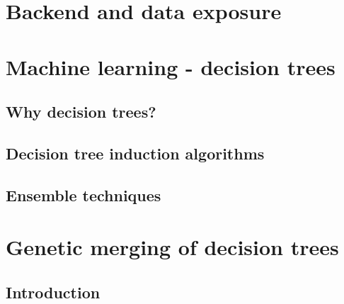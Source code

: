 \documentclass[english]{beamer}
\begin{document}
\section{Backend and data exposure}
\section{Machine learning - decision trees}

\subsection*{Why decision trees?}

\subsection*{Decision tree induction algorithms}

\subsection*{Ensemble techniques}

\section{Genetic merging of decision trees}
\subsection*{Introduction}
\end{document}
